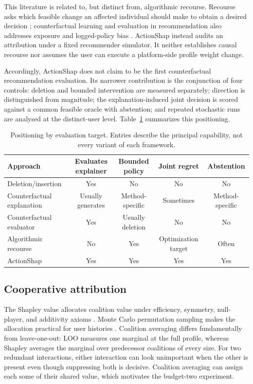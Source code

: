 \documentclass[11pt]{article}
\begin{document}
This literature is related to, but distinct from, algorithmic recourse. Recourse asks which feasible change an affected individual should make to obtain a desired decision \citep{wachter2017,karimi2021}; counterfactual learning and evaluation in recommendation also addresses exposure and logged-policy bias \citep{saito2021}. ActionShap instead audits an attribution under a fixed recommender simulator. It neither establishes causal recourse nor assumes the user can execute a platform-side profile weight change.

Accordingly, ActionShap does not claim to be the first counterfactual recommendation evaluation. Its narrower contribution is the conjunction of four controls: deletion and bounded intervention are measured separately; direction is distinguished from magnitude; the explanation-induced joint decision is scored against a common feasible oracle with abstention; and repeated stochastic runs are analysed at the distinct-user level. Table~\ref{tab:positioning} summarizes this positioning.

\begin{table}[t]
\centering
\small
\caption{Positioning by evaluation target. Entries describe the principal capability, not every variant of each framework.}
\label{tab:positioning}
\begin{tabular}{lcccc}
\toprule
Approach & Evaluates explainer & Bounded policy & Joint regret & Abstention \\
\midrule
Deletion/insertion & Yes & No & No & No \\
Counterfactual explanation & Usually generates & Method-specific & Sometimes & Method-specific \\
Counterfactual evaluator & Yes & Usually deletion & No & No \\
Algorithmic recourse & No & Yes & Optimization target & Often \\
ActionShap & Yes & Yes & Yes & Yes \\
\bottomrule
\end{tabular}
\end{table}

\subsection{Cooperative attribution}
The Shapley value allocates coalition value under efficiency, symmetry, null-player, and additivity axioms \citep{shapley1953}. Monte Carlo permutation sampling makes the allocation practical for user histories \citep{castro2009}. Coalition averaging differs fundamentally from leave-one-out: LOO measures one marginal at the full profile, whereas Shapley averages the marginal over predecessor coalitions of every size. For two redundant interactions, either interaction can look unimportant when the other is present even though suppressing both is decisive. Coalition averaging can assign each some of their shared value, which motivates the budget-two experiment.
\end{document}
